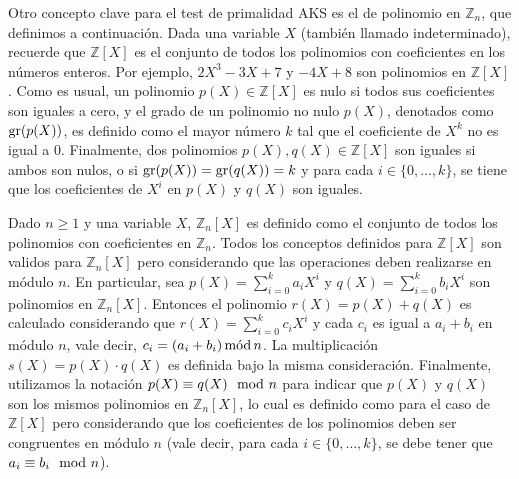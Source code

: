 Otro concepto clave para el test de primalidad AKS es el de
polinomio en $\mathbb{Z}_n$, que definimos a continuación. Dada una
variable $X$ (también llamado indeterminado), recuerde que
$\mathbb{Z}[X]$ es el conjunto de todos los polinomios con
coeficientes en los números enteros. Por ejemplo, $2 X^3 - 3X +7$ y
$-4 X + 8$ son polinomios en $\mathbb{Z}[X]$. Como es usual, un
polinomio $p(X) \in \mathbb{Z}[X]$ es nulo si todos sus coeficientes
son iguales a cero, y el grado de un polinomio no nulo $p(X)$,
denotados como $\grado(p(X))$, es definido como el mayor número $k$
tal que el coeficiente de $X^k$ no es igual a $0$. Finalmente, dos
polinomios $p(X), q(X) \in \mathbb{Z}[X]$ son iguales si ambos son
nulos, o si $\grado(p(X))=\grado(q(X)) = k$ y para cada $i \in \{0,
\ldots, k\}$, se tiene que los coeficientes de $X^i$ en $p(X)$ y
$q(X)$ son iguales.

Dado $n \geq 1$ y una variable $X$, $\mathbb{Z}_n[X]$ es definido como
el conjunto de todos los polinomios con coeficientes en $\mathbb{Z}_n$. Todos
los conceptos definidos para $\mathbb{Z}[X]$ son validos para
$\mathbb{Z}_n[X]$ pero considerando que las operaciones deben
realizarse en módulo $n$. En particular, sea $p(X) = \sum_{i=0}^k a_i
X^i$ y $q(X)= \sum_{i=0}^k b_i X^i$ son polinomios en
$\mathbb{Z}_n[X]$. Entonces el polinomio $r(X) = p(X) + q(X)$ es
calculado considerando que $r(X) = \sum_{i=0}^k c_i X^i$ y cada $c_i$
es igual a $a_i + b_i$ en módulo $n$, vale decir, $c_i = (a_i+b_i)
\mods n$. La multiplicación $s(X) = p(X) \cdot q(X)$ es definida bajo
la misma consideración. Finalmente, utilizamos la notación $p(X)
\equiv q(X) \modl n$ para indicar que $p(X)$ y $q(X)$ son los mismos
polinomios en $\mathbb{Z}_n[X]$, lo cual es definido como para el caso
de $\mathbb{Z}[X]$ pero considerando que los coeficientes de los
polinomios deben ser congruentes en módulo $n$ (vale decir, para cada
$i \in \{0, \ldots, k\}$, se debe tener que $a_i \equiv b_i \modl n$).

